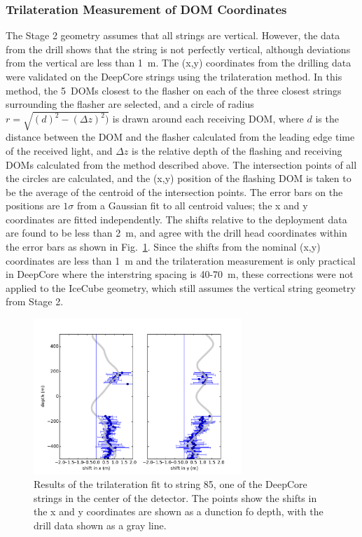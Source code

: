 \subsubsection{Trilateration Measurement of DOM Coordinates}
The Stage 2 geometry assumes that all strings are vertical. However, the data from the drill shows that the string is not perfectly vertical, although deviations from the vertical are less than 1~m. The (x,y) coordinates from the drilling data were validated on the DeepCore strings using the
trilateration method. In this method, the 5~DOMs closest to the
flasher on each of the three closest strings surrounding the flasher are selected,
and a circle of radius $r = \sqrt{(d)^2 - (\Delta z)^2)}$ is drawn
around each receiving DOM, where $d$ is the distance between the DOM and the flasher calculated from the leading edge time of the received
light, and  $\Delta z$ is the relative depth of the flashing and
receiving DOMs calculated from the method described above. The
intersection points of all the circles are calculated, and the (x,y)
position of the flashing DOM is taken to be the average of the
centroid of the intersection points. The error bars on the positions
are $1 \sigma$ from a Gaussian fit to all centroid values; the x and y
coordinates are fitted independently. The shifts relative to the
deployment data are found to be less than 2~m, and agree with the
drill head coordinates within the error bars as shown in Fig.~\ref{fig:trilateration}. Since the shifts from the nominal (x,y) coordinates are less than 1~m and the trilateration measurement is only practical in DeepCore where the interstring spacing is 40-70~m, these corrections were not applied to the IceCube geometry, which still assumes the vertical string geometry from Stage 2.

\begin{figure}[!h]
 \centering
\includegraphics[width=0.7\textwidth]{graphics/geometry/newtrilat85.pdf}
\caption{Results of the trilateration fit to string 85, one of the DeepCore strings in the center of the detector. The points show the shifts in the x and y coordinates are shown as a dunction fo depth, with the drill data shown as a gray line.}
\label{fig:trilateration}
\end{figure}


